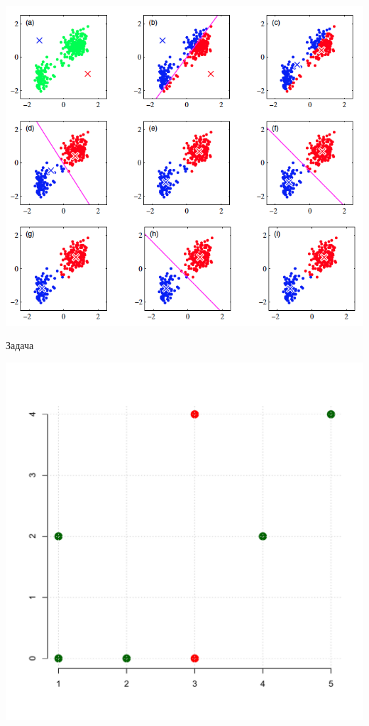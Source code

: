 \documentclass[aspectratio=169]{beamer}
\begin{document}
\begin{frame}{}

\begin{center}
\includegraphics[scale=0.35]{images/kmeans.png}
\end{center}

\end{frame}

\begin{frame}{Задача}

\begin{center}
\includegraphics[height=0.9\textheight]{images/problem.pdf}
\end{center}

\end{frame}
\end{document}
